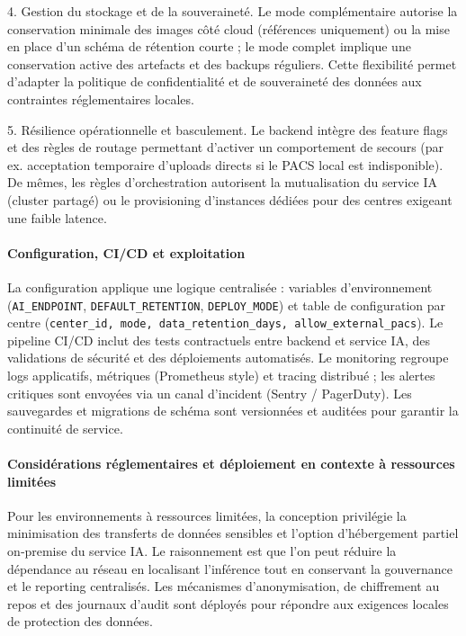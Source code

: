 4. Gestion du stockage et de la souveraineté. Le mode complémentaire autorise la conservation minimale des images côté cloud (références uniquement) ou la mise en place d'un schéma de rétention courte ; le mode complet implique une conservation active des artefacts et des backups réguliers. Cette flexibilité permet d'adapter la politique de confidentialité et de souveraineté des données aux contraintes réglementaires locales.

5. Résilience opérationnelle et basculement. Le backend intègre des feature flags et des règles de routage permettant d'activer un comportement de secours (par ex. acceptation temporaire d'uploads directs si le PACS local est indisponible). De mêmes, les règles d'orchestration autorisent la mutualisation du service IA (cluster partagé) ou le provisioning d'instances dédiées pour des centres exigeant une faible latence.

\paragraph{Configuration, CI/CD et exploitation}
La configuration applique une logique centralisée : variables d'environnement (\texttt{AI\_ENDPOINT}, \texttt{DEFAULT\_RETENTION}, \texttt{DEPLOY\_MODE}) et table de configuration par centre (\texttt{center\_id, mode, data\_retention\_days, allow\_external\_pacs}). Le pipeline CI/CD inclut des tests contractuels entre backend et service IA, des validations de sécurité et des déploiements automatisés. Le monitoring regroupe logs applicatifs, métriques (Prometheus style) et tracing distribué ; les alertes critiques sont envoyées via un canal d'incident (Sentry / PagerDuty). Les sauvegardes et migrations de schéma sont versionnées et auditées pour garantir la continuité de service.

\paragraph{Considérations réglementaires et déploiement en contexte à ressources limitées}
Pour les environnements à ressources limitées, la conception privilégie la minimisation des transferts de données sensibles et l'option d'hébergement partiel on‑premise du service IA. Le raisonnement est que l'on peut réduire la dépendance au réseau en localisant l'inférence tout en conservant la gouvernance et le reporting centralisés. Les mécanismes d'anonymisation, de chiffrement au repos et des journaux d'audit sont déployés pour répondre aux exigences locales de protection des données.

